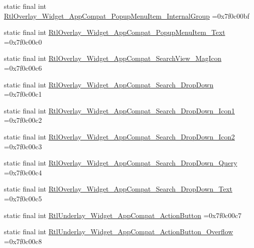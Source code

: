\begin{DoxyCompactItemize}
\item 
static final int \mbox{\hyperlink{classbr_1_1unb_1_1cic_1_1mp_1_1marketmaster_1_1test_1_1R_1_1style_af00bf02255127a1f3d2f3eb122da19e7}{Rtl\+Overlay\+\_\+\+Widget\+\_\+\+App\+Compat\+\_\+\+Popup\+Menu\+Item\+\_\+\+Internal\+Group}} =0x7f0c00bf
\item 
static final int \mbox{\hyperlink{classbr_1_1unb_1_1cic_1_1mp_1_1marketmaster_1_1test_1_1R_1_1style_ae89f5e10fa25bd3daf5357e09e25fa5b}{Rtl\+Overlay\+\_\+\+Widget\+\_\+\+App\+Compat\+\_\+\+Popup\+Menu\+Item\+\_\+\+Text}} =0x7f0c00c0
\item 
static final int \mbox{\hyperlink{classbr_1_1unb_1_1cic_1_1mp_1_1marketmaster_1_1test_1_1R_1_1style_a3a519c380cfcf1eb40ebfab77a6a8a08}{Rtl\+Overlay\+\_\+\+Widget\+\_\+\+App\+Compat\+\_\+\+Search\+View\+\_\+\+Mag\+Icon}} =0x7f0c00c6
\item 
static final int \mbox{\hyperlink{classbr_1_1unb_1_1cic_1_1mp_1_1marketmaster_1_1test_1_1R_1_1style_a0e59dcc98d44b4a93363ff383d5feb31}{Rtl\+Overlay\+\_\+\+Widget\+\_\+\+App\+Compat\+\_\+\+Search\+\_\+\+Drop\+Down}} =0x7f0c00c1
\item 
static final int \mbox{\hyperlink{classbr_1_1unb_1_1cic_1_1mp_1_1marketmaster_1_1test_1_1R_1_1style_a11a3a0c00e590c61f7589a06e016272c}{Rtl\+Overlay\+\_\+\+Widget\+\_\+\+App\+Compat\+\_\+\+Search\+\_\+\+Drop\+Down\+\_\+\+Icon1}} =0x7f0c00c2
\item 
static final int \mbox{\hyperlink{classbr_1_1unb_1_1cic_1_1mp_1_1marketmaster_1_1test_1_1R_1_1style_a23328a294a7ea8a9c56a69428123299a}{Rtl\+Overlay\+\_\+\+Widget\+\_\+\+App\+Compat\+\_\+\+Search\+\_\+\+Drop\+Down\+\_\+\+Icon2}} =0x7f0c00c3
\item 
static final int \mbox{\hyperlink{classbr_1_1unb_1_1cic_1_1mp_1_1marketmaster_1_1test_1_1R_1_1style_a82f0cf3ef87bd0181d765817eb58e524}{Rtl\+Overlay\+\_\+\+Widget\+\_\+\+App\+Compat\+\_\+\+Search\+\_\+\+Drop\+Down\+\_\+\+Query}} =0x7f0c00c4
\item 
static final int \mbox{\hyperlink{classbr_1_1unb_1_1cic_1_1mp_1_1marketmaster_1_1test_1_1R_1_1style_a2dcd5aa070d23608604c6a63d5f1dabe}{Rtl\+Overlay\+\_\+\+Widget\+\_\+\+App\+Compat\+\_\+\+Search\+\_\+\+Drop\+Down\+\_\+\+Text}} =0x7f0c00c5
\item 
static final int \mbox{\hyperlink{classbr_1_1unb_1_1cic_1_1mp_1_1marketmaster_1_1test_1_1R_1_1style_a7ae422e637de0407a951dc72d9b11659}{Rtl\+Underlay\+\_\+\+Widget\+\_\+\+App\+Compat\+\_\+\+Action\+Button}} =0x7f0c00c7
\item 
static final int \mbox{\hyperlink{classbr_1_1unb_1_1cic_1_1mp_1_1marketmaster_1_1test_1_1R_1_1style_aa7243d590888e3db5893b7f399ac6e2f}{Rtl\+Underlay\+\_\+\+Widget\+\_\+\+App\+Compat\+\_\+\+Action\+Button\+\_\+\+Overflow}} =0x7f0c00c8

\end{DoxyCompactItemize}

